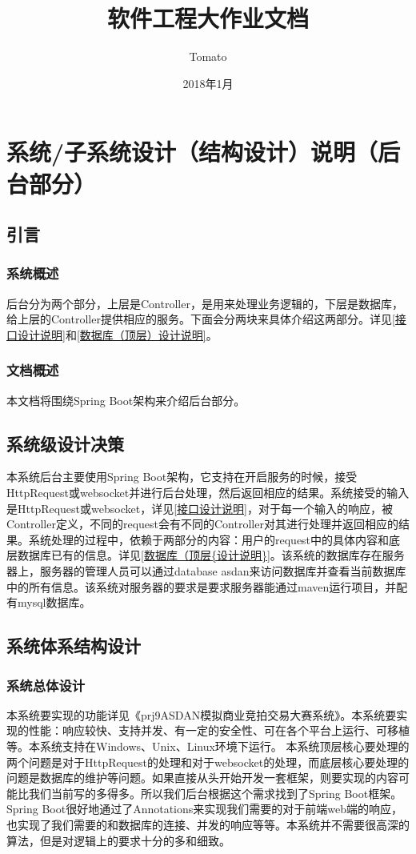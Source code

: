 \documentclass[12pt, a4paper,UTF8]{article}
\title{软件工程大作业文档}
\author{Tomato}
\date{2018年1月}
\begin{document}
	\maketitle
	\section{系统/子系统设计（结构设计）说明（后台部分）}
		\subsection{引言}
			\subsubsection{系统概述}
				后台分为两个部分，上层是Controller，是用来处理业务逻辑的，下层是数据库，给上层的Controller提供相应的服务。下面会分两块来具体介绍这两部分。详见\ref{接口设计说明}和\ref{数据库（顶层）设计说明}。

			\subsubsection{文档概述}
				本文档将围绕Spring Boot架构来介绍后台部分。
		\subsection{系统级设计决策}
			本系统后台主要使用Spring Boot架构，它支持在开启服务的时候，接受HttpRequest或websocket并进行后台处理，然后返回相应的结果。系统接受的输入是HttpRequest或websocket，详见\ref{接口设计说明}，对于每一个输入的响应，被Controller定义，不同的request会有不同的Controller对其进行处理并返回相应的结果。系统处理的过程中，依赖于两部分的内容：用户的request中的具体内容和底层数据库已有的信息。详见\ref{数据库（顶层{设计说明}}。该系统的数据库存在服务器上，服务器的管理人员可以通过database asdan来访问数据库并查看当前数据库中的所有信息。该系统对服务器的要求是要求服务器能通过maven运行项目，并配有mysql数据库。
		\subsection{系统体系结构设计}
			\subsubsection{系统总体设计}
					本系统要实现的功能详见《prj9ASDAN模拟商业竞拍交易大赛系统》。本系统要实现的性能：响应较快、支持并发、有一定的安全性、可在各个平台上运行、可移植等。本系统支持在Windows、Unix、Linux环境下运行。
					本系统顶层核心要处理的两个问题是对于HttpRequest的处理和对于websocket的处理，而底层核心要处理的问题是数据库的维护等问题。如果直接从头开始开发一套框架，则要实现的内容可能比我们当前写的多得多。所以我们后台根据这个需求找到了Spring Boot框架。Spring Boot很好地通过了Annotations来实现我们需要的对于前端web端的响应，也实现了我们需要的和数据库的连接、并发的响应等等。本系统并不需要很高深的算法，但是对逻辑上的要求十分的多和细致。
\end{document}
